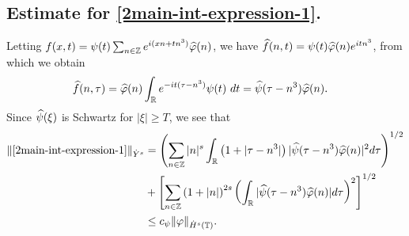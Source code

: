 \subsection{Estimate for \ref{2main-int-expression-1}.}
%
%
Letting $f(x,t) = \psi(t) \sum_{n \in \mathbb{Z}} e^{i(xn + tn^{3})} 
\widehat{\varphi}(n)$, we have $\widehat{f}(n,t) = \psi(t) \widehat{\varphi}(n) e^{itn^{3}}$,
from which we obtain
%
%
\begin{equation}
	\label{2fourier-trans-calc}
	\begin{split}
		\widehat{f}(n, \tau)
		& = \widehat{\varphi}(n) \int_{\mathbb{R}} e^{-it( \tau - n^{3})} 
		\psi(t) \ d t
		= \widehat{\psi}(\tau - n^{3}) \widehat{\varphi}(n).
	\end{split}
\end{equation}
%
%
%
%
%
%
Since $\widehat{\psi}(\xi)$ is Schwartz for $|\xi| \ge T$, we see that 
%
%
\begin{equation}
	\begin{split}
	\label{2main-int1-est}
		\|\eqref{2main-int-expression-1}\|_{\dot{Y}^s}
		& = \left (  \sum_{n\in \mathbb{Z}} |n|^s \int_{\mathbb{R}} \left( 1 + | \tau - n^{3} 
		| \right )
		| \widehat{\psi}(\tau - n^{3}) \widehat{\varphi}(n) |^2 d \tau \right)^{1/2} 
		\\
		& + \left[ \sum_{n \in \mathbb{Z} }\left( 1 + | n | \right)^{2s} \left( \int_{\mathbb{R}} |
		\widehat{\psi}(\tau - n^{3})\widehat{\varphi}(n) | d \tau
		\right)^{2} \right]^{1/2}
		\\
		& \le c_{\psi}
		\|\varphi\|_{\dot{H}^s(\mathbb{T})}.
	\end{split}
\end{equation}
%
%
%
%
